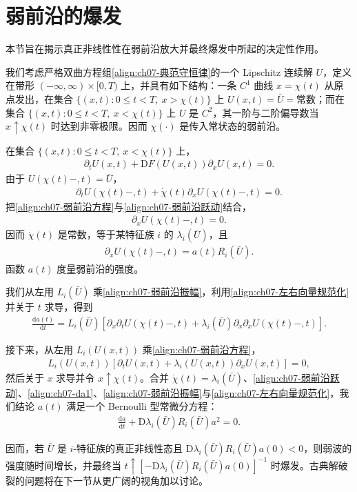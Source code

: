 \documentclass[../../main.tex]{subfiles}
\begin{document}
\section{弱前沿的爆发}\label{section:ch07-弱前沿爆发}

本节旨在揭示真正非线性性在弱前沿放大并最终爆发中所起的决定性作用。

我们考虑严格双曲方程组\eqref{align:ch07-典范守恒律}的一个 Lipschitz 连续解 $U$，定义在带形 $(-\infty,\infty)\times[0,T)$ 上，并具有如下结构：一条 $C^1$ 曲线 $x=\chi(t)$ 从原点发出，在集合 $\{(x,t):0\leqslant t<T,\ x>\chi(t)\}$ 上 $U(x,t)=\bar{U}=\text{常数}$；而在集合 $\{(x,t):0\leqslant t<T,\ x<\chi(t)\}$ 上 $U$ 是 $C^2$，其一阶与二阶偏导数当 $x\uparrow\chi(t)$ 时达到非零极限。因而 $\chi(\cdot)$ 是传入常状态的弱前沿。

在集合 $\{(x,t):0\leqslant t<T,\ x<\chi(t)\}$ 上，
\begin{align}
\partial_t U(x,t)+\mathrm{D}F(U(x,t))\partial_x U(x,t)=0.
\label{align:ch07-弱前沿方程}
\end{align}
由于 $U(\chi(t)-,t)=\bar{U}$，
\begin{align}
\partial_t U(\chi(t)-,t)+\dot{\chi}(t)\partial_x U(\chi(t)-,t)=0.
\label{align:ch07-弱前沿跃动}
\end{align}
把\eqref{align:ch07-弱前沿方程}与\eqref{align:ch07-弱前沿跃动}结合，
\begin{align}
[\mathrm{D}F(\bar{U})-\dot{\chi}(t)I]\partial_x U(\chi(t)-,t)=0.
\label{align:ch07-弱前沿特征值}
\end{align}
因而 $\dot{\chi}(t)$ 是常数，等于某特征族 $i$ 的 $\lambda_i(\bar{U})$，且
\begin{align}
\partial_x U(\chi(t)-,t)=a(t)R_i(\bar{U}).
\label{align:ch07-弱前沿振幅}
\end{align}
函数 $a(t)$ 度量弱前沿的强度。

我们从左用 $L_i(\bar{U})$ 乘\eqref{align:ch07-弱前沿振幅}，利用\eqref{align:ch07-左右向量规范化}并关于 $t$ 求导，得到
\begin{align}
\frac{\mathrm{d}a(t)}{\mathrm{d}t}=L_i(\bar{U})\left[\partial_x\partial_t U(\chi(t)-,t)+\lambda_i(\bar{U})\partial_x\partial_x U(\chi(t)-,t)\right].
\label{align:ch07-da1}
\end{align}

接下来，从左用 $L_i(U(x,t))$ 乘\eqref{align:ch07-弱前沿方程}，
\begin{align}
L_i(U(x,t))\left[\partial_t U(x,t)+\lambda_i(U(x,t))\partial_x U(x,t)\right]=0,
\label{align:ch07-弱前沿左乘}
\end{align}
然后关于 $x$ 求导并令 $x\uparrow\chi(t)$。合并 $\dot{\chi}(t)=\lambda_i(\bar{U})$、\eqref{align:ch07-弱前沿跃动}、\eqref{align:ch07-da1}、\eqref{align:ch07-弱前沿振幅}与\eqref{align:ch07-左右向量规范化}，我们结论 $a(t)$ 满足一个 Bernoulli 型常微分方程：
\begin{align}
\frac{\mathrm{d}a}{\mathrm{d}t}+\mathrm{D}\lambda_i(\bar{U})R_i(\bar{U})a^2=0.
\label{align:ch07-Bernoulli}
\end{align}

因而，若 $\bar{U}$ 是 $i$-特征族的真正非线性态且 $\mathrm{D}\lambda_i(\bar{U})R_i(\bar{U})a(0)<0$，则弱波的强度随时间增长，并最终当 $t\uparrow[-\mathrm{D}\lambda_i(\bar{U})R_i(\bar{U})a(0)]^{-1}$ 时爆发。古典解破裂的问题将在下一节从更广阔的视角加以讨论。
\end{document}
